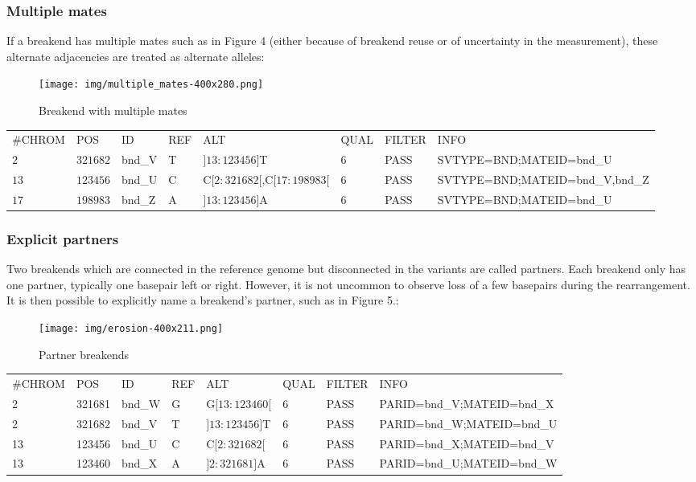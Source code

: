 \documentclass[8pt]{article}
\begin{document}
\subsubsection{Multiple mates}
If a breakend has multiple mates such as in Figure 4 (either because of breakend reuse or of uncertainty in the measurement), these alternate adjacencies are treated as alternate alleles:

\begin{figure}[h]
\centering
\texttt{[image: img/multiple\_mates-400x280.png]}
\caption{Breakend with multiple mates}
\end{figure}

\footnotesize
\begin{tabular}{ l l l l l l l l }
\#CHROM & POS & ID & REF & ALT & QUAL & FILTER & INFO \\
$2$ & $321682$ & bnd\_V & T & $]13:123456]$T & 6 & PASS & SVTYPE=BND;MATEID=bnd\_U \\
$13$ & $123456$ & bnd\_U & C & C$[2:321682[$,C$[17:198983[$ & 6 & PASS & SVTYPE=BND;MATEID=bnd\_V,bnd\_Z \\
$17$ & $198983$ & bnd\_Z & A & $]13:123456]$A & 6 & PASS & SVTYPE=BND;MATEID=bnd\_U \\
\end{tabular}
\normalsize

\subsubsection{Explicit partners}
Two breakends which are connected in the reference genome but disconnected in the variants are called partners. Each breakend only has one partner, typically one basepair left or right. However, it is not uncommon to observe loss of a few basepairs during the rearrangement. It is then possible to explicitly name a breakend's partner, such as in Figure 5.:

\begin{figure}[ht]
\centering
\texttt{[image: img/erosion-400x211.png]}
\caption{Partner breakends}
\end{figure}

\small
\begin{tabular}{ l l l l l l l l }
\#CHROM & POS & ID & REF & ALT & QUAL & FILTER & INFO \\
2 & 321681 & bnd\_W & G & G$[13:123460[$ & 6 & PASS & PARID=bnd\_V;MATEID=bnd\_X \\
2 & 321682 & bnd\_V & T & $]13:123456]$T & 6 & PASS & PARID=bnd\_W;MATEID=bnd\_U \\
13 & 123456 & bnd\_U & C & C$[2:321682[$ & 6 & PASS &  PARID=bnd\_X;MATEID=bnd\_V \\
13 & 123460 & bnd\_X & A & $]2:321681]$A & 6 & PASS &  PARID=bnd\_U;MATEID=bnd\_W \\
\end{tabular}
\normalsize
\end{document}
